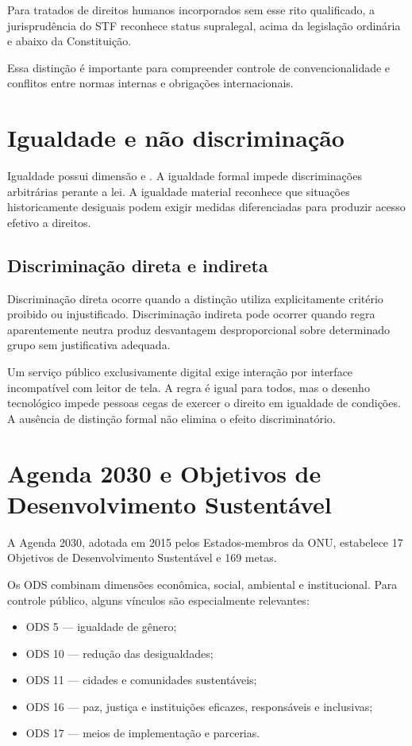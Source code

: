 Para tratados de direitos humanos incorporados sem esse rito qualificado, a jurisprudência do STF reconhece status supralegal, acima da legislação ordinária e abaixo da Constituição.

Essa distinção é importante para compreender controle de convencionalidade e conflitos entre normas internas e obrigações internacionais.

\section{Igualdade e não discriminação}

Igualdade possui dimensão  e . A igualdade formal impede discriminações arbitrárias perante a lei. A igualdade material reconhece que situações historicamente desiguais podem exigir medidas diferenciadas para produzir acesso efetivo a direitos.

\subsection{Discriminação direta e indireta}

Discriminação direta ocorre quando a distinção utiliza explicitamente critério proibido ou injustificado. Discriminação indireta pode ocorrer quando regra aparentemente neutra produz desvantagem desproporcional sobre determinado grupo sem justificativa adequada.

\begin{exemplo}
Um serviço público exclusivamente digital exige interação por interface incompatível com leitor de tela. A regra é igual para todos, mas o desenho tecnológico impede pessoas cegas de exercer o direito em igualdade de condições. A ausência de distinção formal não elimina o efeito discriminatório.
\end{exemplo}

\section{Agenda 2030 e Objetivos de Desenvolvimento Sustentável}

A Agenda 2030, adotada em 2015 pelos Estados-membros da ONU, estabelece 17 Objetivos de Desenvolvimento Sustentável e 169 metas.

Os ODS combinam dimensões econômica, social, ambiental e institucional. Para controle público, alguns vínculos são especialmente relevantes:
\begin{itemize}
\item ODS 5 — igualdade de gênero;
\item ODS 10 — redução das desigualdades;
\item ODS 11 — cidades e comunidades sustentáveis;
\item ODS 16 — paz, justiça e instituições eficazes, responsáveis e inclusivas;
\item ODS 17 — meios de implementação e parcerias.
\end{itemize}

